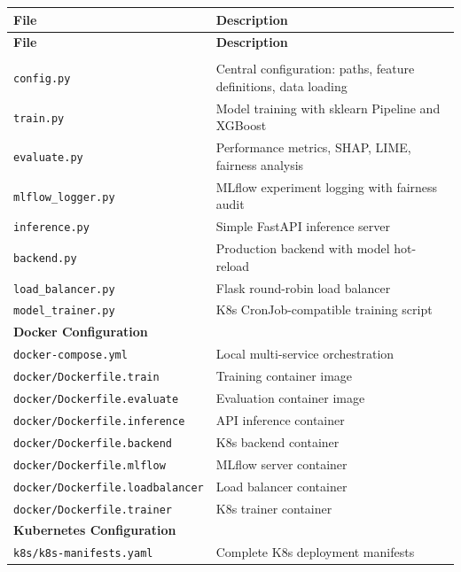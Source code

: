 \documentclass[11pt,a4paper]{article}
\begin{document}
\begin{longtable}{@{}p{4cm}p{9cm}@{}}
\toprule
\textbf{File} & \textbf{Description} \\
\midrule
\endfirsthead
\toprule
\textbf{File} & \textbf{Description} \\
\midrule
\endhead
\bottomrule
\endfoot

\multicolumn{2}{l}{\textbf{Core Python Files}} \\
\midrule
\texttt{config.py} & Central configuration: paths, feature definitions, data loading \\
\texttt{train.py} & Model training with sklearn Pipeline and XGBoost \\
\texttt{evaluate.py} & Performance metrics, SHAP, LIME, fairness analysis \\
\texttt{mlflow\_logger.py} & MLflow experiment logging with fairness audit \\
\texttt{inference.py} & Simple FastAPI inference server \\
\texttt{backend.py} & Production backend with model hot-reload \\
\texttt{load\_balancer.py} & Flask round-robin load balancer \\
\texttt{model\_trainer.py} & K8s CronJob-compatible training script \\

\midrule
\multicolumn{2}{l}{\textbf{Docker Configuration}} \\
\midrule
\texttt{docker-compose.yml} & Local multi-service orchestration \\
\texttt{docker/Dockerfile.train} & Training container image \\
\texttt{docker/Dockerfile.evaluate} & Evaluation container image \\
\texttt{docker/Dockerfile.inference} & API inference container \\
\texttt{docker/Dockerfile.backend} & K8s backend container \\
\texttt{docker/Dockerfile.mlflow} & MLflow server container \\
\texttt{docker/Dockerfile.loadbalancer} & Load balancer container \\
\texttt{docker/Dockerfile.trainer} & K8s trainer container \\

\midrule
\multicolumn{2}{l}{\textbf{Kubernetes Configuration}} \\
\midrule
\texttt{k8s/k8s-manifests.yaml} & Complete K8s deployment manifests \\


\end{longtable}
\end{document}
